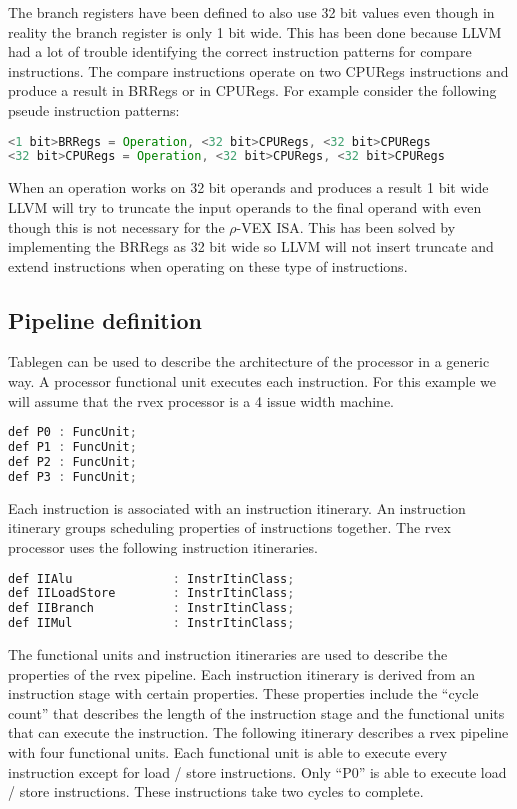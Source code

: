 The branch registers have been defined to also use 32 bit values even though in reality the branch register is only 1 bit wide. This has been done because LLVM had a lot of trouble identifying the correct instruction patterns for compare instructions. The compare instructions operate on two CPURegs instructions and produce a result in BRRegs or in CPURegs. For example consider the following pseude instruction patterns:

\begin{lstlisting}[language=java] 
<1 bit>BRRegs = Operation, <32 bit>CPURegs, <32 bit>CPURegs
<32 bit>CPURegs = Operation, <32 bit>CPURegs, <32 bit>CPURegs
\end{lstlisting}

When an operation works on 32 bit operands and produces a result 1 bit wide LLVM will try to truncate the input operands to the final operand with even though this is not necessary for the $\rho$-VEX ISA. This has been solved by implementing the BRRegs as 32 bit wide so LLVM will not insert truncate and extend instructions when operating on these type of instructions.

\subsection{Pipeline definition}
Tablegen can be used to describe the architecture of the processor in a generic way. A processor functional unit executes each instruction. For this example we will assume that the rvex processor is a 4 issue width machine.

\begin{lstlisting}[language=java] 
def P0 : FuncUnit;
def P1 : FuncUnit;
def P2 : FuncUnit;
def P3 : FuncUnit;
\end{lstlisting}

Each instruction is associated with an instruction itinerary. An instruction itinerary groups scheduling properties of instructions together. The rvex processor uses the following instruction itineraries.

\begin{lstlisting}[language=java] 
def IIAlu              : InstrItinClass;
def IILoadStore        : InstrItinClass;
def IIBranch           : InstrItinClass;
def IIMul              : InstrItinClass;
\end{lstlisting}

The functional units and instruction itineraries are used to describe the properties of the rvex pipeline. Each instruction itinerary is derived from an instruction stage with certain properties. These properties include the “cycle count” that describes the length of the instruction stage and the functional units that can execute the instruction. The following itinerary describes a rvex pipeline with four functional units. Each functional unit is able to execute every instruction except for load / store instructions. Only “P0” is able to execute load / store instructions. These instructions take two cycles to complete.

